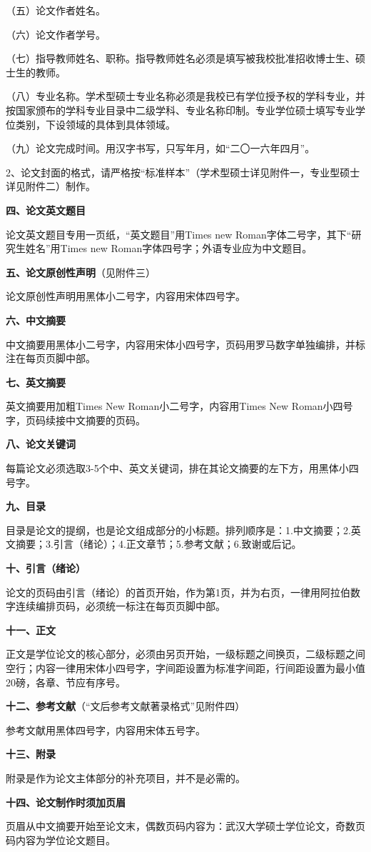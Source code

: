 （五）论文作者姓名。

（六）论文作者学号。

（七）指导教师姓名、职称。指导教师姓名必须是填写被我校批准招收博士生、硕士生的教师。

（八）专业名称。学术型硕士专业名称必须是我校已有学位授予权的学科专业，并按国家颁布的学科专业目录中二级学科、专业名称印制。专业学位硕士填写专业学位类别，下设领域的具体到具体领域。

（九）论文完成时间。用汉字书写，只写年月，如“二〇一六年四月”。

2、论文封面的格式，请严格按“标准样本”（学术型硕士详见附件一，专业型硕士详见附件二）制作。

\textbf{四、论文英文题目}

论文英文题目专用一页纸，“英文题目”用Times new Roman字体二号字，其下“研究生姓名”用Times new Roman字体四号字；外语专业应为中文题目。

\textbf{五、论文原创性声明}（见附件三）

论文原创性声明用黑体小二号字，内容用宋体四号字。

\textbf{六、中文摘要}

中文摘要用黑体小二号字，内容用宋体小四号字，页码用罗马数字单独编排，并标注在每页页脚中部。

\textbf{七、英文摘要}

英文摘要用加粗Times New Roman小二号字，内容用Times New Roman小四号字，页码续接中文摘要的页码。

\textbf{八、论文关键词}

每篇论文必须选取3-5个中、英文关键词，排在其论文摘要的左下方，用黑体小四号字。

\textbf{九、目录}

目录是论文的提纲，也是论文组成部分的小标题。排列顺序是：1.中文摘要；2.英文摘要；3.引言（绪论）；4.正文章节；5.参考文献；6.致谢或后记。

\textbf{十、引言（绪论）}

论文的页码由引言（绪论）的首页开始，作为第1页，并为右页，一律用阿拉伯数字连续编排页码，必须统一标注在每页页脚中部。

\textbf{十一、正文}

正文是学位论文的核心部分，必须由另页开始，一级标题之间换页，二级标题之间空行；内容一律用宋体小四号字，字间距设置为标准字间距，行间距设置为最小值20磅，各章、节应有序号。

\textbf{十二、参考文献}（“文后参考文献著录格式”见附件四）

参考文献用黑体四号字，内容用宋体五号字。

\textbf{十三、附录}

附录是作为论文主体部分的补充项目，并不是必需的。



\textbf{十四、论文制作时须加页眉}


页眉从中文摘要开始至论文末，偶数页码内容为：武汉大学硕士学位论文，奇数页码内容为学位论文题目。